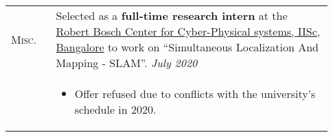 \documentclass[letterpaper, 10pt, oneside]{article}
\newcommand{\stitle}[1]{\normalsize{\textsc{#1}}}
\begin{document}
\begin{longtable}{@{} p{0.13\linewidth} p{0.8\linewidth}}


    \stitle{Misc.}
                         & Selected as a \textbf{full-time research intern} at the
    \href{https://cps.iisc.ac.in/}{Robert Bosch Center for Cyber-Physical systems, IISc, Bangalore} to work on
    ``Simultaneous Localization And Mapping - SLAM''.
    \hfill \textsl{July 2020}                                                                                                                                                                                                                            \\
                         & \parbox{0.8\textwidth}{                                                                                                                                                                                                       %
        \begin{itemize}[leftmargin=6ex, itemsep=-0.88ex, topsep=-0.88ex]
            \item Offer refused due to conflicts with the university's schedule in 2020.
        \end{itemize}
    }
    \\[1.5ex]


\end{longtable}
\end{document}
